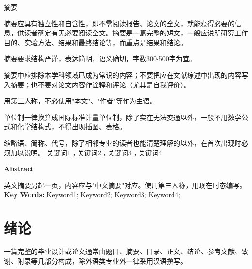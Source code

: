 \documentclass[
	StudentName     = 姓名,
	StudentID       = 学号,
	AdvisorName     = 指导教师,
	Grade           = 年级,
	Major           = 专业,
	Department      = 一个很长很长的名字,
	SubmitYear		= 2022,
	SubmitMonth		= 5,
	Title           = 论文中文题目,
	TitleEng        = {{English Title}}
]{cauc_thesis}
\newcommand{\inputpage}[1]{
	
}
\begin{document}
	\inputpage{cover}
	
	\newpage
	\setcounter{page}{1}
	\setlength{\headsep}{1.224cm}
	\begin{center}
		\fakehei 摘\quad 要
	\end{center}
	\vspace{21pt}
	
	
	\setlength{\baselineskip}{20pt}
	摘要应具有独立性和自含性，即不需阅读报告、论文的全文，就能获得必要的信息，供读者确定有无必要阅读全文。摘要是一篇完整的短文，一般应说明研究工作目的、实验方法、结果和最终结论等，而重点是结果和结论。
	
	摘要要求结构严谨，表达简明，语义确切，字数300-500字为宜。
	
	摘要中应排除本学科领域已成为常识的内容；不要把应在文献综述中出现的内容写入摘要；也不要对论文内容作诠释和评论（尤其是自我评价）。
	
	用第三人称，不必使用"本文"、"作者"等作为主语。
	
	单位制一律换算成国际标准计量单位制，除了实在无法变通以外，一般不用数学公式和化学结构式，不得出现插图、表格。
	
	缩略语、简称、代号，除了相邻专业的读者也能清楚理解的以外，在首次出现时必须加以说明。
	\newline
	\newline
	\indent{} 关键词1；关键词2；关键词3；关键词4

	\newpage
	\setlength{\headsep}{1.224cm}
	\begin{center}
		 \textbf{Abstract} 
	\end{center}
	\vspace{21pt}
	英文摘要另起一页，内容应与"中文摘要"对应。使用第三人称，用现在时态编写。
	\newline
	\newline
	\indent{}\textbf{Key Words: }\songti Keyword1; Keyword2; Keyword3; Keyword4;
	
	\newpage
	\setlength{\headsep}{-0.3cm}
	\tableofcontents
	\clearpage	%
	\setcounter{page}{1}

	
	\setlength{\headsep}{0.624cm}
	\pagestyle{fancy}
	\setlength{\baselineskip}{20pt}
	{\centering\chapter{绪论}}
	\setlength{\baselineskip}{20pt}
	一篇完整的毕业设计或论文通常由题目、摘要、目录、正文、结论、参考文献、致谢、附录等几部分构成，除外语类专业外一律采用汉语撰写。
	
\end{document}
